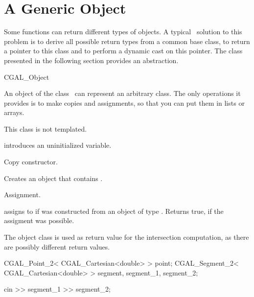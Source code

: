 
\cleardoublepage
\chapter{A Generic Object} \label{Generic_Object}

Some functions can return different types of objects. A typical
\CC\ solution to this problem is to derive all possible return
types from a common base class, to return a pointer to this 
class and to perform a dynamic cast on this pointer. The class
presented in the following section provides an abstraction.

 
\begin{class} {CGAL_Object}

  An object  of the class \classname\ can
represent an arbitrary class. The only operations it provides is
to make copies and assignments, so that you can put them in lists
or arrays.

This class is not templated.


\creation
{}

            {introduces an uninitialized variable.}

            {Copy constructor.}


{Creates an object that contains .}

\threecolumns{5cm}{4cm}

\operations
{}
            {Assignment.}


       {assigns  to  if 
        was constructed from an object of type .
        Returns true, if the assigment was possible.}


\example

The object class is used as return value for the intersection computation,
as there are possibly different return values.

\begin{cprog}
{
  CGAL_Point_2< CGAL_Cartesian<double> > point;
  CGAL_Segment_2< CGAL_Cartesian<double> > segment,  segment_1, segment_2;

  cin >> segment_1 >> segment_2;

}
\end{cprog}
\end{class}
